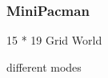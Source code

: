\PraesentationMasterStandard

\begin{frame}
    \frametitle{MiniPacman}

\begin{PraesentationAufzaehlung}
	\item 15 * 19 Grid World
	\item different modes
\end{PraesentationAufzaehlung}
    
\end{frame}
\clearpage




